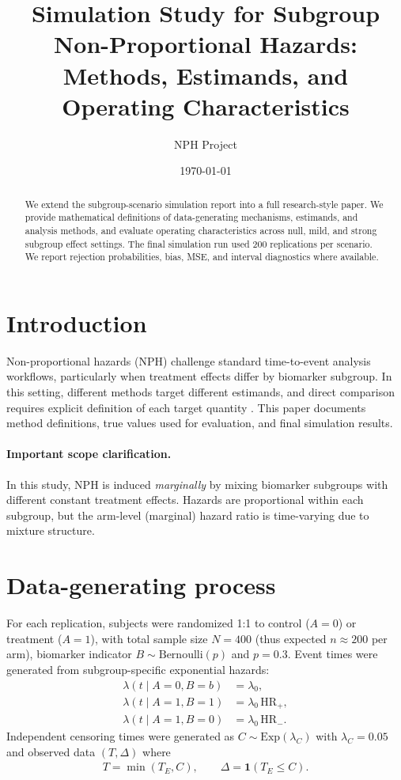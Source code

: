 \documentclass[11pt]{article}
\title{Simulation Study for Subgroup Non-Proportional Hazards: Methods, Estimands, and Operating Characteristics}
\author{NPH Project}
\date{\today}
\begin{document}
\maketitle

\begin{abstract}
We extend the subgroup-scenario simulation report into a full research-style paper. We provide mathematical definitions of data-generating mechanisms, estimands, and analysis methods, and evaluate operating characteristics across null, mild, and strong subgroup effect settings. The final simulation run used 200 replications per scenario. We report rejection probabilities, bias, MSE, and interval diagnostics where available.
\end{abstract}

\section{Introduction}
Non-proportional hazards (NPH) challenge standard time-to-event analysis workflows, particularly when treatment effects differ by biomarker subgroup. In this setting, different methods target different estimands, and direct comparison requires explicit definition of each target quantity \citep{morris2019}. This paper documents method definitions, true values used for evaluation, and final simulation results.

\paragraph{Important scope clarification.}
In this study, NPH is induced \emph{marginally} by mixing biomarker subgroups with different constant treatment effects. Hazards are proportional within each subgroup, but the arm-level (marginal) hazard ratio is time-varying due to mixture structure.

\section{Data-generating process}
For each replication, subjects were randomized 1:1 to control ($A=0$) or treatment ($A=1$), with total sample size $N=400$ (thus expected $n\approx 200$ per arm), biomarker indicator $B\sim\text{Bernoulli}(p)$ and $p=0.3$. Event times were generated from subgroup-specific exponential hazards:
\begin{align}
\lambda(t\mid A=0,B=b) &= \lambda_0,\\
\lambda(t\mid A=1,B=1) &= \lambda_0\,\mathrm{HR}_{+},\\
\lambda(t\mid A=1,B=0) &= \lambda_0\,\mathrm{HR}_{-}.
\end{align}
Independent censoring times were generated as $C\sim\mathrm{Exp}(\lambda_C)$ with $\lambda_C=0.05$ and observed data $(T,\Delta)$ where
\begin{align}
T=\min(T_E,C),\qquad \Delta=\mathbf{1}(T_E\le C).
\end{align}
\end{document}
